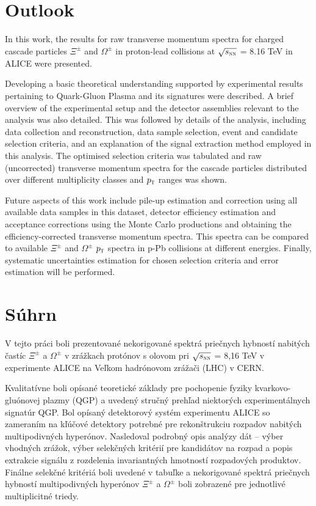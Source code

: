 \chapter{Outlook}
In this work, the results for raw transverse momentum spectra for charged cascade particles $\Xi^{\pm}$ and $\Omega^{\pm}$ in proton-lead collisions at
$\sqrt{s_{\textnormal{\sc nn}}}$ = 8.16 TeV in ALICE were presented.

Developing a basic theoretical understanding supported by experimental results pertaining to Quark-Gluon Plasma and its signatures were described. A brief
overview of the experimental setup and the detector assemblies relevant to the analysis was also detailed. This was followed by details of the analysis,
including data collection and reconstruction, data sample selection, event and candidate selection criteria, and an explanation of the signal extraction
method employed in this analysis. The optimised selection criteria was tabulated and raw (uncorrected) transverse momentum spectra for the cascade particles
distributed over different multiplicity classes and $p_{\textnormal{\sc t}}$ ranges was shown.

Future aspects of this work include pile-up estimation and correction using all available data samples in this dataset, detector efficiency estimation and
acceptance corrections using the Monte Carlo productions and obtaining the efficiency-corrected transverse momentum spectra. This spectra can be
compared to available $\Xi^{\pm}$
and $\Omega^{\pm}$ $p_{\textnormal{\sc t}}$ spectra in p-Pb collisions at different energies. Finally, systematic uncertainties estimation for chosen selection
criteria and error estimation will be performed.



\chapter*{Súhrn}
V tejto práci boli prezentované nekorigované spektrá priečnych hybností nabitých častíc $\Xi^{\pm}$ a $\Omega^{\pm}$ v zrážkach protónov s olovom pri 
$\sqrt{s_{\textnormal{\sc nn}}}$ = 8,16 TeV v experimente ALICE na Veľkom hadrónovom zrážači (LHC) v CERN.

Kvalitatívne boli opísané teoretické základy pre pochopenie fyziky kvarkovo-gluónovej plazmy (QGP) a uvedený stručný prehľad niektorých experimentálnych 
signatúr QGP. Bol opísaný detektorový systém experimentu ALICE so zameraním na kľúčové detektory potrebné pre rekonštrukciu rozpadov nabitých multipodivných 
hyperónov. Nasledoval podrobný opis analýzy dát -- výber vhodných zrážok, výber selekčných kritérií pre kandidátov na rozpad a popis extrakcie signálu z 
rozdelenia invariantných hmotností rozpadových produktov. Finálne selekčné kritériá boli uvedené v tabuľke a nekorigované spektrá priečnych hybností multipodivných 
hyperónov $\Xi^{\pm}$ a $\Omega^{\pm}$ boli zobrazené pre jednotlivé multiplicitné triedy.

